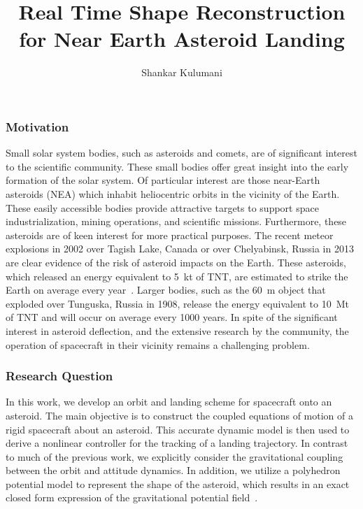 \documentclass[11pt,reqno,twocolumn]{article} %
\title{Real Time Shape Reconstruction for Near Earth Asteroid Landing}
\author{Shankar Kulumani}
\date{} %
\begin{document}
\maketitle
\subsubsection*{Motivation}
Small solar system bodies, such as asteroids and comets, are of significant interest to the scientific community.
These small bodies offer great insight into the early formation of the solar system.
Of particular interest are those near-Earth asteroids (NEA) which inhabit heliocentric orbits in the vicinity of the Earth.
These easily accessible bodies provide attractive targets to support space industrialization, mining operations, and scientific missions.
Furthermore, these asteroids are of keen interest for more practical purposes.
The recent meteor explosions in  2002 over Tagish Lake, Canada or over Chelyabinsk, Russia in 2013 are clear evidence of the risk of asteroid impacts on the Earth.
These asteroids, which released an energy equivalent to \SI{5}{\kilo\tonne} of TNT, are estimated to strike the Earth on average every year~\cite{brown2002}.
Larger bodies, such as the \SI{60}{\meter} object that exploded over Tunguska, Russia in 1908, release the energy equivalent to \SI{10}{\mega\tonne} of TNT and will occur on average every \num{1000} years.
In spite of the significant interest in asteroid deflection, and the extensive research by the community, the operation of spacecraft in their vicinity remains a challenging problem.

\subsubsection*{Research Question}
In this work, we develop an orbit and landing scheme for spacecraft onto an asteroid.
The main objective is to construct the coupled equations of motion of a rigid spacecraft about an asteroid.
This accurate dynamic model is then used to derive a nonlinear controller for the tracking of a landing trajectory.
In contrast to much of the previous work, we explicitly consider the gravitational coupling between the orbit and attitude dynamics.
In addition, we utilize a polyhedron potential model to represent the shape of the asteroid, which results in an exact closed form expression of the gravitational potential field~\cite{werner1994,werner1996}.
\end{document}
